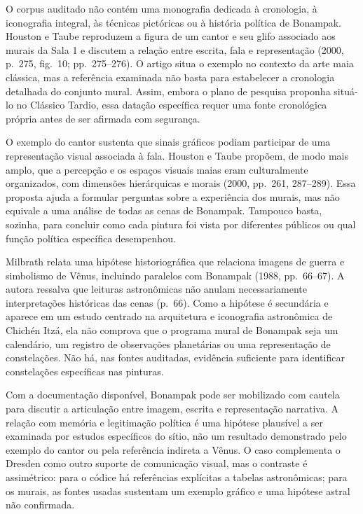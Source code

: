 \documentclass[
  brazilian,
]{article}
\begin{document}
O corpus auditado não contém uma monografia dedicada à cronologia, à
iconografia integral, às técnicas pictóricas ou à história política de
Bonampak. Houston e Taube reproduzem a figura de um cantor e seu glifo
associado aos murais da Sala 1 e discutem a relação entre escrita, fala
e representação (2000, p.~275, fig.~10; pp.~275--276). O artigo situa o
exemplo no contexto da arte maia clássica, mas a referência examinada
não basta para estabelecer a cronologia detalhada do conjunto mural.
Assim, embora o plano de pesquisa proponha situá-lo no Clássico Tardio,
essa datação específica requer uma fonte cronológica própria antes de
ser afirmada com segurança.

O exemplo do cantor sustenta que sinais gráficos podiam participar de
uma representação visual associada à fala. Houston e Taube propõem, de
modo mais amplo, que a percepção e os espaços visuais maias eram
culturalmente organizados, com dimensões hierárquicas e morais (2000,
pp.~261, 287--289). Essa proposta ajuda a formular perguntas sobre a
experiência dos murais, mas não equivale a uma análise de todas as cenas
de Bonampak. Tampouco basta, sozinha, para concluir como cada pintura
foi vista por diferentes públicos ou qual função política específica
desempenhou.

Milbrath relata uma hipótese historiográfica que relaciona imagens de
guerra e simbolismo de Vênus, incluindo paralelos com Bonampak (1988,
pp.~66--67). A autora ressalva que leituras astronômicas não anulam
necessariamente interpretações históricas das cenas (p.~66). Como a
hipótese é secundária e aparece em um estudo centrado na arquitetura e
iconografia astronômica de Chichén Itzá, ela não comprova que o programa
mural de Bonampak seja um calendário, um registro de observações
planetárias ou uma representação de constelações. Não há, nas fontes
auditadas, evidência suficiente para identificar constelações
específicas nas pinturas.

Com a documentação disponível, Bonampak pode ser mobilizado com cautela
para discutir a articulação entre imagem, escrita e representação
narrativa. A relação com memória e legitimação política é uma hipótese
plausível a ser examinada por estudos específicos do sítio, não um
resultado demonstrado pelo exemplo do cantor ou pela referência indireta
a Vênus. O caso complementa o Dresden como outro suporte de comunicação
visual, mas o contraste é assimétrico: para o códice há referências
explícitas a tabelas astronômicas; para os murais, as fontes usadas
sustentam um exemplo gráfico e uma hipótese astral não confirmada.
\end{document}
